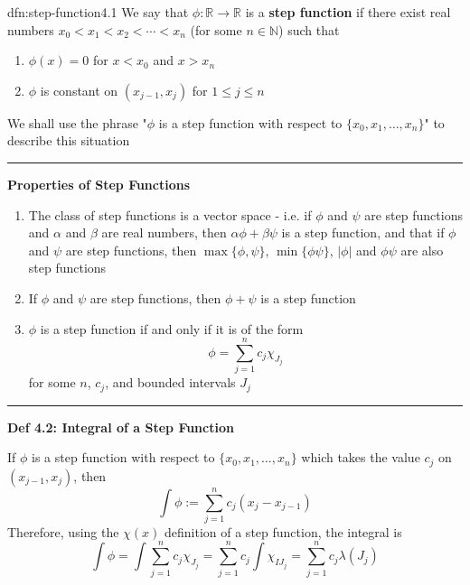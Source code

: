 \documentclass[landscape, 8pt]{extarticle}
\begin{document}
\begin{multicols}{3}
\begin{dfn}{dfn:step-function}{4.1}
	\vspace{-5pt}
	We say that $\phi:\mathbb{R}\to \mathbb{R}$ is a \textbf{step function} if there exist real numbers $x_{0}<x_{1}<x_{2}<\cdots<x_{n}$ (for some $n\in \mathbb{N}$) such that

	\vspace{-5pt}
	\begin{enumerate}
	    \setlength\itemsep{0em}
	    \item $\phi(x)=0$ for $x<x_{0}$ and $x>x_{n}$
	    \item $\phi$ is constant on $(x_{j-1}, x_{j})$ for $1\le j \le n$
	\end{enumerate}

	\vspace{-5pt}
	We shall use the phrase "$\phi$ is a step function with respect to $\{x_{0},x_{1},\dots,x_{n}\}$" to describe this situation


	\noindent\rule{\textwidth}{0.2pt}

	\textbf{Properties of Step Functions}

	\vspace{-5pt}
	\begin{enumerate}
	    \setlength\itemsep{0em}
	    \item The class of step functions is a vector space - i.e. if $\phi$ and $\psi$ are step functions and $\alpha$ and $\beta$ are real numbers, then $\alpha\phi+\beta\psi$ is a step function, and that if $\phi$ and $\psi$ are step functions, then $\max\{\phi,\psi\}$, $\min\{\phi\psi\}$, $\lvert \phi \rvert$ and $\phi\psi$ are also step functions
	    \item If $\phi$ and $\psi$ are step functions, then $\phi + \psi$ is a step function
	    \item $\phi$ is a step function if and only if it is of the form
	\[\phi=\sum_{j=1}^{n} c_{j}\chi_{J_{j}}\]
	for some $n$, $c_{j}$, and bounded intervals $J_{j}$
	\end{enumerate}

	\vspace{-8pt}
	\noindent\rule{\textwidth}{0.2pt}

	\textbf{Def 4.2: Integral of a Step Function}

	If $\phi$ is a step function with respect to $\{x_{0},x_{1},\dots,x_{n}\}$ which takes the value $c_{j}$ on $(x_{j-1},x_{j})$, then
	\[\int \phi := \sum_{j=1}^{n} c_{j}(x_{j}-x_{j-1})\]
	Therefore, using the $\chi(x)$ definition of a step function, the integral is
	\[\int \phi = \int \sum_{j=1}^{n} c_{j}\chi_{J_{j}}=\sum_{j=1}^{n} c_{j}\int \chi_{IJ_{j}}=\sum_{j=1}^{n} c_{j}\lambda(J_{j})\]
\end{dfn}


\end{multicols}
\end{document}
